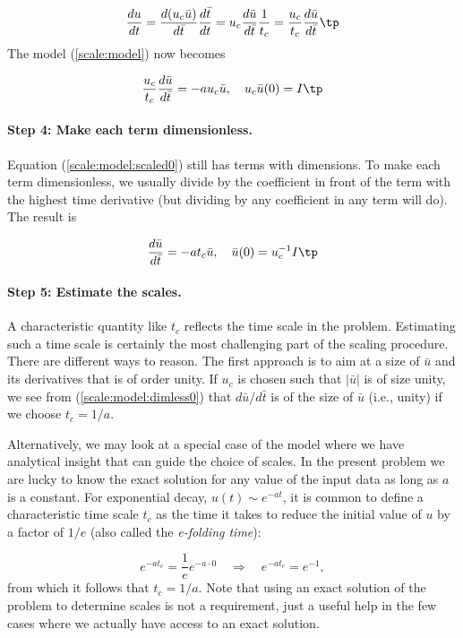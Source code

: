 \documentclass[graybox,envcountchap,sectrefs,final]{svmonodo}
\begin{document}
\[ \frac{du}{dt} = \frac{d (u_c\bar u)}{d\bar t}\frac{d\bar t}{dt}
= u_c\frac{d\bar u}{d\bar t}\frac{1}{t_c} =
\frac{u_c}{t_c}\frac{d\bar u}{d\bar t}\tp
\]
The model (\ref{scale:model}) now becomes

\begin{equation}
\frac{u_c}{t_c}\frac{d\bar u}{d\bar t} = -au_c\bar u,\quad u_c\bar u(0)=I\tp
\label{scale:model:scaled0}
\end{equation}

\paragraph{Step 4: Make each term dimensionless.}
Equation (\ref{scale:model:scaled0}) still has terms with
dimensions. To make each term dimensionless, we usually divide by
the coefficient in front of the term with the highest time derivative
(but dividing by any coefficient in any term will do). The result is

\begin{equation}
\frac{d\bar u}{d\bar t} = -at_c\bar u,\quad \bar u(0)=u_c^{-1}I
\tp
\label{scale:model:dimless0}
\end{equation}

\paragraph{Step 5: Estimate the scales.}
A characteristic quantity like $t_c$ reflects the time scale in the
problem. Estimating such a time scale is certainly
the most challenging part of the scaling procedure. There are different
ways to reason. The first approach
is to aim at a size of $\bar u$ and its derivatives
that is of order unity. If $u_c$ is chosen such that $|\bar u|$ is
of size unity, we see from (\ref{scale:model:dimless0}) that
$d\bar u/d\bar t$ is of the size of $\bar u$ (i.e., unity)
if we choose $t_c = 1/a$.


Alternatively, we may look at a special case of the model where we have
analytical insight that can guide the choice of scales.
In the present problem we are lucky to know the
exact solution for any value of the input data as long as $a$
is a constant. For exponential
decay,
$u(t)\sim e^{-at}$, it is common to define a characteristic time
scale $t_c$ as the time it takes to reduce the initial value of
$u$ by a factor of $1/e$ (also called the \emph{e-folding time}):

\[ e^{-at_c} = \frac{1}{e}e^{-a\cdot 0}\quad\Rightarrow\quad e^{-at_c}=e^{-1},
\]
from which it follows that $t_c = 1/a$.
Note that using an exact solution of the problem to determine
scales is not a requirement, just a useful help in the few cases where
we actually have access to an exact solution.
\end{document}
